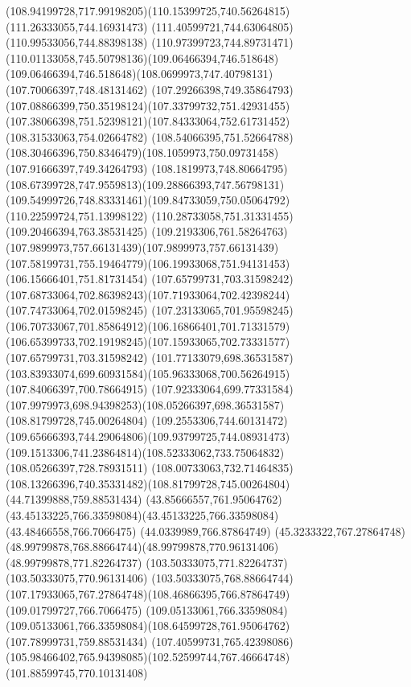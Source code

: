 {{	\curveto(108.94199728,717.99198205)(110.15399725,740.56264815)(111.26333055,744.16931473)
	\lineto(111.40599721,744.63064805)
	\lineto(110.99533056,744.88398138)
	\curveto(110.97399723,744.89731471)(110.01133058,745.50798136)(109.06466394,746.518648)
	\curveto(109.06466394,746.518648)(108.0699973,747.40798131)(107.70066397,748.48131462)
	\curveto(107.29266398,749.35864793)(107.08866399,750.35198124)(107.33799732,751.42931455)
	\curveto(107.38066398,751.52398121)(107.84333064,752.61731452)(108.31533063,754.02664782)
	\lineto(108.54066395,751.52664788)
	\curveto(108.30466396,750.8346479)(108.1059973,750.09731458)(107.91666397,749.34264793)
	\curveto(108.1819973,748.80664795)(108.67399728,747.9559813)(109.28866393,747.56798131)
	\curveto(109.54999726,748.83331461)(109.84733059,750.05064792)(110.22599724,751.13998122)
	\lineto(110.28733058,751.31331455)
	\lineto(109.20466394,763.38531425)
	\curveto(109.2193306,761.58264763)(107.9899973,757.66131439)(107.9899973,757.66131439)
	\curveto(107.58199731,755.19464779)(106.19933068,751.94131453)(106.15666401,751.81731454)
	\moveto(107.65799731,703.31598242)
	\curveto(107.68733064,702.86398243)(107.71933064,702.42398244)(107.74733064,702.01598245)
	\curveto(107.23133065,701.95598245)(106.70733067,701.85864912)(106.16866401,701.71331579)
	\curveto(106.65399733,702.19198245)(107.15933065,702.73331577)(107.65799731,703.31598242)
	\moveto(101.77133079,698.36531587)
	\curveto(103.83933074,699.60931584)(105.96333068,700.56264915)(107.84066397,700.78664915)
	\curveto(107.92333064,699.77331584)(107.9979973,698.94398253)(108.05266397,698.36531587)
	\closepath
	\moveto(108.81799728,745.00264804)
	\curveto(109.2553306,744.60131472)(109.65666393,744.29064806)(109.93799725,744.08931473)
	\curveto(109.1513306,741.23864814)(108.52333062,733.75064832)(108.05266397,728.78931511)
	\curveto(108.00733063,732.71464835)(108.13266396,740.35331482)(108.81799728,745.00264804)
	\moveto(44.71399888,759.88531434)
	\curveto(43.85666557,761.95064762)(43.45133225,766.33598084)(43.45133225,766.33598084)
	\lineto(43.48466558,766.7066475)
	\lineto(44.0339989,766.87864749)
	\curveto(45.3233322,767.27864748)(48.99799878,768.88664744)(48.99799878,770.96131406)
	\lineto(48.99799878,771.82264737)
	\lineto(103.50333075,771.82264737)
	\lineto(103.50333075,770.96131406)
	\curveto(103.50333075,768.88664744)(107.17933065,767.27864748)(108.46866395,766.87864749)
	\lineto(109.01799727,766.7066475)
	\lineto(109.05133061,766.33598084)
	\curveto(109.05133061,766.33598084)(108.64599728,761.95064762)(107.78999731,759.88531434)
	\lineto(107.40599731,765.42398086)
	\curveto(105.98466402,765.94398085)(102.52599744,767.46664748)(101.88599745,770.10131408)
}}
